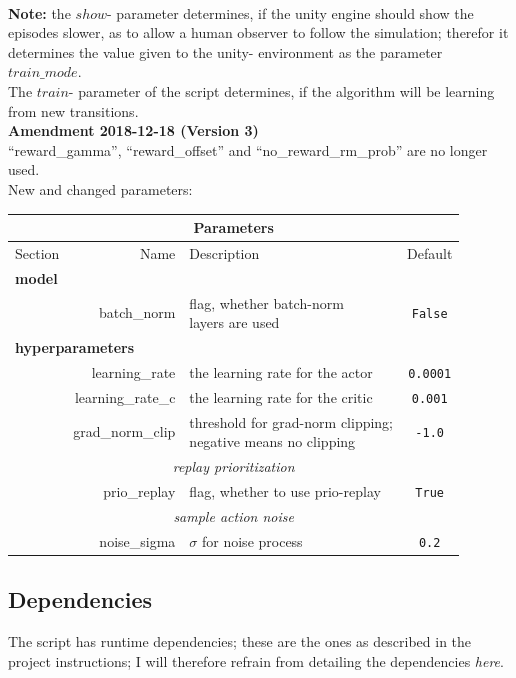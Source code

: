 \documentclass[a4paper]{article}
\begin{document}
\normalsize
\\
\textbf{Note:} the $show$- parameter determines, if the unity engine should
show the episodes slower, as to allow a human observer to follow the simulation; therefor
it determines the value given to the unity- environment as the parameter $train\_mode$.
\\
The $train$- parameter of the script determines, if the algorithm will be learning
from new transitions.
\\

\textbf{Amendment 2018-12-18 (Version 3)}\\
\enquote{reward\_gamma}, \enquote{reward\_offset} and \enquote{no\_reward\_rm\_prob}
are no longer used.
\\
New and changed parameters:
\small
\begin{tabular}{ |l|r|l|c| }
  \hline
  \multicolumn{4}{|c|}{Parameters} \\
  \hline
Section & Name & Description & Default \\
  \hline
\multicolumn{4}{|l|}{\textbf{model}} \\
               & batch\_norm & \makecell[tl]{flag, whether batch-norm \\ layers are used} & \texttt{False} \\
\multicolumn{4}{|l|}{\textbf{hyperparameters}} \\
               & learning\_rate & the learning rate for the actor & \texttt{0.0001} \\
               & learning\_rate\_c & the learning rate for the critic & \texttt{0.001} \\
               & grad\_norm\_clip & \makecell[tl]{threshold for grad-norm clipping; \\ negative means no clipping} & \texttt{-1.0} \\
\multicolumn{4}{|c|}{\textit{replay prioritization}} \\
               & prio\_replay & flag, whether to use prio-replay & \texttt{True} \\
\multicolumn{4}{|c|}{\textit{sample action noise}} \\
               & noise\_sigma & $\sigma$ for noise process & \texttt{0.2} \\
\hline
\end{tabular}
\normalsize

\subsection{Dependencies}
The script has runtime dependencies; these are the ones as described in the
project instructions; I will therefore refrain from detailing the dependencies \textit{here}.
\end{document}
